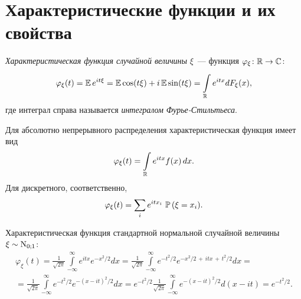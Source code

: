 \section{Характеристические функции и их свойства}
\begin{defn}
    \textit{Характеристическая функция случайной величины} $\xi$~--- функция $\varphi_{\xi} \colon \mathbb{R} \to \mathbb{C}$:
    \begin{equation*}
        \varphi_{\xi}(t)
        = \operatorname{\mathbb{E}} e^{it \xi}
        = \operatorname{\mathbb{E}} \cos (t \xi)+i \operatorname{\mathbb{E}} \sin (t \xi) = \int\limits_{\mathbb{R}}^{} e^{i t x} d F_{\xi}(x),
    \end{equation*}
    где интеграл справа называется \textit{интегралом Фурье-Стильтьеса}.
    
    Для абсолютно непрерывного распределения характеристическая функция имеет вид
    \begin{equation*}
        \varphi_{\xi}(t)=\int\limits_{\mathbb{R}} e^{i t x} f(x) \, dx.
    \end{equation*}
    Для дискретного, соответственно,
    \begin{equation*}
        \varphi_{\xi}(t)=\sum\limits_{i} e^{i t x_{i}} \, \operatorname{\mathbb{P}}\left(\xi=x_{i}\right) \! .
    \end{equation*}
\end{defn}

\begin{exmp}
    Характеристическая функция стандартной нормальной случайной величины $\xi \sim \operatorname{\mathrm{N}}_{0;1}$:
    \begin{multline*}
        \varphi_{\xi}(t) 
        = \frac{1}{\sqrt{2 \pi}} \int\limits_{-\infty}^{\infty} e^{i t x} e^{-x^{2} / 2} d x
        = \frac{1}{\sqrt{2 \pi}} \int\limits_{-\infty}^{\infty} e^{-t^{2} / 2} e^{-x^2/2 \,+\, itx \,+\, t^2/2} d x = \\
        = \frac{1}{\sqrt{2 \pi}} \int\limits_{-\infty}^{\infty} e^{-t^{2} / 2} e^{-(x-i t)^{2} / 2} d x =  
         e^{-t^{2} / 2} \frac{1}{\sqrt{2 \pi}} \int\limits_{-\infty}^{\infty} e^{-(x-i t)^{2} / 2} d(x-i t)
        = e^{-t^{2} / 2}.
    \end{multline*}
\end{exmp}


